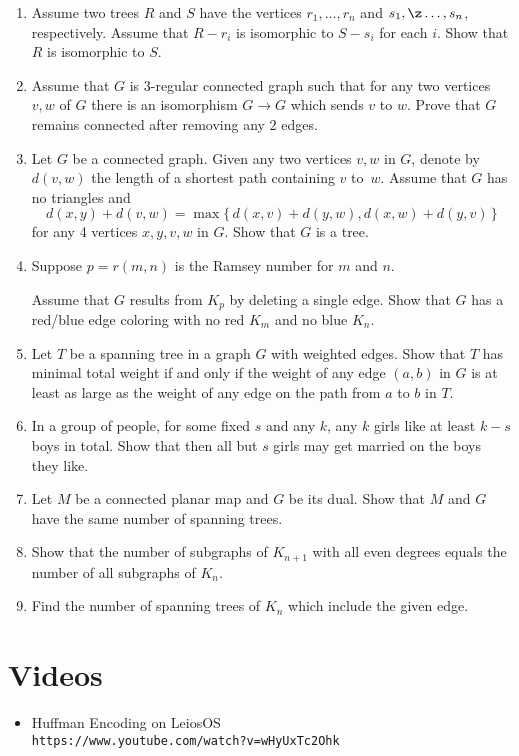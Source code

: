 \begin{enumerate}
\item Assume two trees $R$ and $S$ 
have the vertices $r_1,\dots,r_n$ and $s_1,\z\dots,s_n$, respectively.
Assume that $R-r_i$ is isomorphic to $S-s_i$ for each $i$.
Show that $R$ is isomorphic to $S$.

\item Assume that $G$ is $3$-regular connected graph such that 
for any two vertices $v,w$ of $G$ there is an isomorphism
$G\to G$ which sends $v$ to $w$.
Prove that $G$ remains connected after removing any $2$ edges.

\item  Let $G$ be a connected graph.
Given any two vertices $v,w$ in $G$, denote by $d(v,w)$ the length of a shortest path containing $v$ to~$w$. 
Assume that $G$ has no triangles and
\[d(x,y)+d(v,w)=\max\{\,d(x,v)+d(y,w),d(x,w)+d(y,v)\,\}\]
for any 4 vertices $x,y,v,w$ in $G$.
Show that $G$ is a tree.

\item Suppose $p=r(m,n)$ is the Ramsey number for $m$ and $n$.

Assume that $G$ results from $K_p$ by deleting a single edge.
Show that $G$ has a red/blue edge coloring with no red
$K_m$ and no blue $K_n$.

\item Let $T$ be a spanning tree in a graph $G$ with weighted edges.
Show that $T$ has minimal total weight if and only if the weight of any edge $(a,b)$ in $G$ is at least as large as the weight of any edge on the path from $a$ to $b$ in $T$.

\item In a group of people, for some fixed $s$ and any $k$,
any $k$ girls like at least $k-s$ boys in total.
Show that then all but $s$ girls may get married on the boys they like.

\item Let $M$ be a connected planar map and $G$ be its dual.
Show that $M$ and $G$ have the same number of spanning trees.

\item Show that the number of subgraphs of $K_{n+1}$ with all even degrees equals the number of all subgraphs of $K_n$.

\item Find the number of spanning trees of $K_n$ which include the given edge.

\end{enumerate}

\chapter{Videos}

\begin{itemize}
 \item Huffman Encoding on LeiosOS\\ \texttt{https://www.youtube.com/watch?v=wHyUxTc2Ohk}
\end{itemize}
